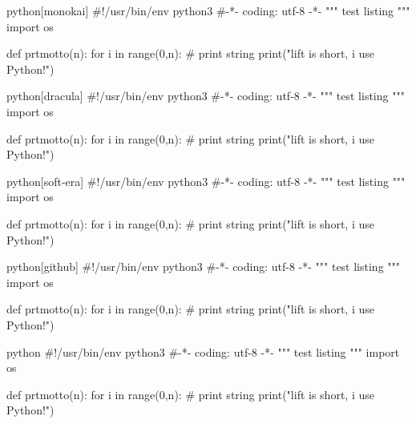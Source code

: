 \documentclass[utf8,a4paper,11pt]{article}
\begin{document}
\newpage

\begin{sourcecode}[monokai]{python}[monokai]
#!/usr/bin/env python3
#-*- coding: utf-8 -*-
"""
test listing
"""
import os

def prtmotto(n):
    for i in range(0,n):
        # print string
        print("lift is short, i use Python!")
\end{sourcecode}

\vspace{6em}

\begin{sourcecode}[dracula]{python}[dracula]
#!/usr/bin/env python3
#-*- coding: utf-8 -*-
"""
test listing
"""
import os

def prtmotto(n):
    for i in range(0,n):
        # print string
        print("lift is short, i use Python!")
\end{sourcecode}

\newpage

\begin{sourcecode}{python}[soft-era]
#!/usr/bin/env python3
#-*- coding: utf-8 -*-
"""
test listing
"""
import os

def prtmotto(n):
    for i in range(0,n):
        # print string
        print("lift is short, i use Python!")
\end{sourcecode}

\vspace{6em}

\begin{sourcecode}[github]{python}[github]
#!/usr/bin/env python3
#-*- coding: utf-8 -*-
"""
test listing
"""
import os

def prtmotto(n):
    for i in range(0,n):
        # print string
        print("lift is short, i use Python!")
\end{sourcecode}

\newpage

\begin{sourcecode}[default]{python}
#!/usr/bin/env python3
#-*- coding: utf-8 -*-
"""
test listing
"""
import os

def prtmotto(n):
    for i in range(0,n):
        # print string
        print("lift is short, i use Python!")
\end{sourcecode}
\end{document}
